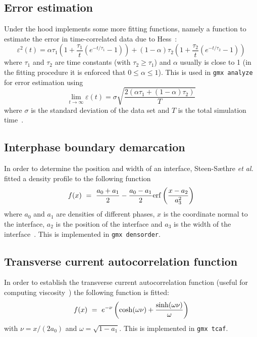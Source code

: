 \subsection{Error estimation}
Under the hood {\gromacs} implements some more fitting functions,
namely a function to estimate the error in time-correlated data due to Hess~\cite{Hess2002a}:
\begin{equation}
\varepsilon^2(t) =
\alpha\tau_1\left(1+\frac{\tau_1}{t}\left(e^{-t/\tau_1}-1\right)\right)
      + (1-\alpha)\tau_2\left(1+\frac{\tau_2}{t}\left(e^{-t/\tau_2}-1\right)\right)
\end{equation}
where $\tau_1$ and
$\tau_2$ are time constants (with $\tau_2 \ge \tau_1$) and $\alpha$
usually is close to 1 (in the fitting procedure it is enforced that
$0\leq\alpha\leq 1$). This is used in {\tt gmx analyze} for error
estimation using
\begin{equation}
\lim_{t\rightarrow\infty}\varepsilon(t) = \sigma\sqrt{\frac{2(\alpha\tau_1+(1-\alpha)\tau_2)}{T}}
\end{equation}
where $\sigma$ is the standard deviation of the data set and $T$ is
the total simulation time~\cite{Hess2002a}.

\subsection{Interphase boundary demarcation}
In order to determine the position and width of an interface,
Steen-S{\ae}thre {\em et al.} fitted a density profile to the
following function
\begin{equation}
f(x) ~=~ \frac{a_0+a_1}{2} - \frac{a_0-a_1}{2}{\rm
  erf}\left(\frac{x-a_2}{a_3^2}\right)
\end{equation}
where $a_0$ and $a_1$ are densities of different phases, $x$ is the
coordinate normal to the interface, $a_2$ is the position of the
interface and $a_3$ is the width of the
interface~\cite{Steen-Saethre2014a}.
This is implemented in {\tt gmx densorder}.

\subsection{Transverse current autocorrelation function}
In order to establish the transverse current autocorrelation function
(useful for computing viscosity~\cite{Palmer1994a})
the following function is fitted:
\begin{equation}
f(x) ~=~ e^{-\nu}\left({\rm cosh}(\omega\nu)+\frac{{\rm
    sinh}(\omega\nu)}{\omega}\right)
\end{equation}
with $\nu = x/(2a_0)$ and $\omega = \sqrt{1-a_1}$.
This is implemented in {\tt gmx tcaf}.

